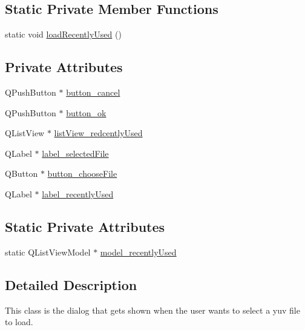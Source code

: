 \subsection*{Static Private Member Functions}
\begin{DoxyCompactItemize}
\item 
static void \hyperlink{classGUI_1_1YuvFileOpenDialog_a318e31abdf8ef4a5b2c903d41f3daab3}{load\+Recently\+Used} ()
\end{DoxyCompactItemize}
\subsection*{Private Attributes}
\begin{DoxyCompactItemize}
\item 
Q\+Push\+Button $\ast$ \hyperlink{classGUI_1_1YuvFileOpenDialog_ab370378f59e456f6179be2167af82034}{button\+\_\+cancel}
\item 
Q\+Push\+Button $\ast$ \hyperlink{classGUI_1_1YuvFileOpenDialog_ac404fa1107dd730776bc91574e8f3a3f}{button\+\_\+ok}
\item 
Q\+List\+View $\ast$ \hyperlink{classGUI_1_1YuvFileOpenDialog_a577fe75a463f5650057b556fe0c2b195}{list\+View\+\_\+redcently\+Used}
\item 
Q\+Label $\ast$ \hyperlink{classGUI_1_1YuvFileOpenDialog_a0aeb5de7d951b040847c1637ac451b5c}{label\+\_\+selected\+File}
\item 
Q\+Button $\ast$ \hyperlink{classGUI_1_1YuvFileOpenDialog_a3b143ce4befc9a6dc06d3762cab7116c}{button\+\_\+choose\+File}
\item 
Q\+Label $\ast$ \hyperlink{classGUI_1_1YuvFileOpenDialog_aae4728a310c045183260227691f3f988}{label\+\_\+recently\+Used}
\end{DoxyCompactItemize}
\subsection*{Static Private Attributes}
\begin{DoxyCompactItemize}
\item 
static Q\+List\+View\+Model $\ast$ \hyperlink{classGUI_1_1YuvFileOpenDialog_ac7a4c287a48420b5a4d3c9e948deddee}{model\+\_\+recently\+Used}
\end{DoxyCompactItemize}


\subsection{Detailed Description}
This class is the dialog that gets shown when the user wants to select a yuv file to load. 


